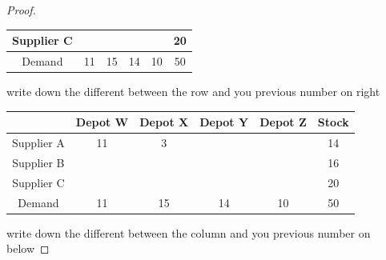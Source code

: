 \documentclass[a4paper]{article}
\begin{document}
\begin{eg}
\begin{proof}
\begin{center}
\begin{tabular}{|c|c|c|c|c|c|}
				\hline
				Supplier C &         &         &         &         & 20    \\
				\hline
				Demand     & 11      & 15      & 14      & 10      & 50    \\
				\hline
			\end{tabular}
		\end{center}
		write down the different between the row and you previous number on right
		\begin{center}
			\begin{tabular}{|c|c|c|c|c|c|}
				\hline
				           & Depot W & Depot X & Depot Y & Depot Z & Stock \\
				\hline
				Supplier A & 11      & 3       &         &         & 14    \\
				\hline
				Supplier B &         &         &         &         & 16    \\
				\hline
				Supplier C &         &         &         &         & 20    \\
				\hline
				Demand     & 11      & 15      & 14      & 10      & 50    \\
				\hline
			\end{tabular}
		\end{center}
		write down the different between the column and you previous number on below


\end{proof}
\end{eg}
\end{document}

